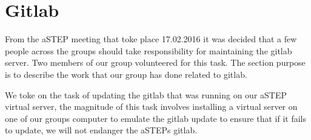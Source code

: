 \section{Gitlab}
From the aSTEP meeting that toke place 17.02.2016 it was decided that a few people across the groups should take responsibility for maintaining the gitlab server. Two members of our group volunteered for this task. The section purpose is to describe the work that our group has done related to gitlab.

We toke on the task of updating the gitlab that was running on our aSTEP virtual server, the magnitude of this task involves installing a virtual server on one of our groups computer to emulate the gitlab update to ensure that if it fails to update, we will not endanger the aSTEPs gitlab.


